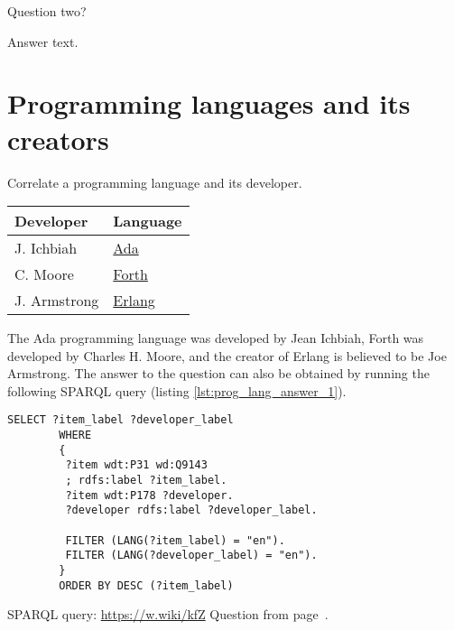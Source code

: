 \begin{exercise}%
    \label{answer:formulate-your-short-label-for-question-here-please2}
Question two?
\end{exercise}

Answer text.


\section{Programming languages and its creators}
\begin{exercise}
    \label{answer:prog_lang_1}
Correlate a programming language and its developer.
\newline
	\begin{tabular}{ll}
		Developer & Language\\
		\hline
		J. Ichbiah & \href{https://www.wikidata.org/wiki/Q154755}{Ada}\\
		C. Moore & \href{https://www.wikidata.org/wiki/Q275472}{Forth}\\
		J. Armstrong & \href{https://www.wikidata.org/wiki/Q334879}{Erlang}\\
	\end{tabular}
\end{exercise}
    The Ada programming language was developed by Jean Ichbiah, Forth was developed by Charles H. Moore, and the creator of Erlang is believed to be Joe Armstrong. The answer to the question can also be obtained by running the following SPARQL query (listing \ref{lst:prog_lang_answer_1}). 
	\begin{lstlisting}[language=SPARQL, caption={{Programming languages developers}\protect\footnotemark}, label=lst:prog_lang_answer_1]
		SELECT ?item_label ?developer_label
		WHERE
		{
		 ?item wdt:P31 wd:Q9143
		 ; rdfs:label ?item_label. 
		 ?item wdt:P178 ?developer.
		 ?developer rdfs:label ?developer_label.
		 
		 FILTER (LANG(?item_label) = "en"). 
		 FILTER (LANG(?developer_label) = "en"). 
		}
		ORDER BY DESC (?item_label)
	\end{lstlisting}
SPARQL query: \href{https://w.wiki/kfZ}{https://w.wiki/kfZ}
\newline
Question from page~\pageref{question:prog_lang_1}.


